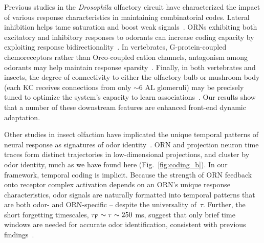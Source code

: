 \documentclass[9pt,twocolumn,twoside,lineno]{pnas-new}
\begin{document}
Previous studies in the \textit{Drosophila} olfactory circuit have characterized the impact of various response characteristics in maintaining combinatorial codes. Lateral inhibition helps tame saturation and boost weak signals~\cite{divisive_normalization}. ORNs exhibiting both excitatory and inhibitory responses to odorants can increase coding capacity by exploiting response bidirectionality~\cite{Cao_Tu_WL}. In vertebrates, G-protein-coupled chemoreceptors rather than Orco-coupled cation channels, antagonism among odorants may help maintain response sparsity~\cite{reddy2017antagonism}. Finally, in both vertebrates and insects, the degree of connectivity to either the olfactory bulb or mushroom body (each KC receives connections from only $\sim$6 AL glomeruli) may be precisely tuned to optimize the system's capacity to learn associations~\cite{litwinkumar}. Our results show that a number of these downstream features are enhanced front-end dynamic adaptation. 

Other studies in insect olfaction have implicated the unique temporal patterns of neural response as signatures of odor identity~\cite{stopfer_temporal_model, multiple_timescales_stopfer, stopfer_nat_neuro, stopfer_temporal_channel}. ORN and projection neuron time traces form distinct trajectories in low-dimensional projections, and cluster by odor identity, much as we have found here (Fig.~\ref{fig:coding_b}). %
In our framework, temporal coding is implicit. Because the strength of ORN feedback onto receptor complex activation depends on an ORN's unique response characteristics, odor signals are naturally formatted into temporal patterns that are both odor- and ORN-specific --  despite the universality of~$\tau$. Further, the short forgetting timescales, $\tau_{\textup F} \sim \tau \sim 250$ ms, suggest that only brief time windows are needed for accurate odor identification, consistent with previous findings~\cite{stopfer_nat_neuro}. 
\end{document}
